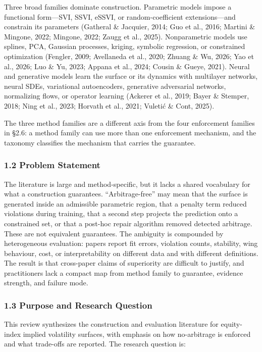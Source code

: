 \documentclass[11pt]{article}
\begin{document}
Three broad families dominate construction. Parametric models impose a functional form—SVI, SSVI, eSSVI, or random-coefficient extensions—and constrain its parameters (Gatheral \& Jacquier, 2014; Guo et al., 2016; Martini \& Mingone, 2022; Mingone, 2022; Zaugg et al., 2025). Nonparametric models use splines, PCA, Gaussian processes, kriging, symbolic regression, or constrained optimization (Fengler, 2009; Avellaneda et al., 2020; Zhuang \& Wu, 2026; Yao et al., 2026; Luo \& Yu, 2023; Appana et al., 2024; Cousin \& Gueye, 2021). Neural and generative models learn the surface or its dynamics with multilayer networks, neural SDEs, variational autoencoders, generative adversarial networks, normalizing flows, or operator learning (Ackerer et al., 2019; Bayer \& Stemper, 2018; Ning et al., 2023; Horvath et al., 2021; Vuletić \& Cont, 2025).

The three method families are a different axis from the four enforcement families in \S 2.6: a method family can use more than one enforcement mechanism, and the taxonomy classifies the mechanism that carries the guarantee.

\subsubsection*{1.2 Problem Statement}
The literature is large and method-specific, but it lacks a shared vocabulary for what a construction guarantees. “Arbitrage-free” may mean that the surface is generated inside an admissible parametric region, that a penalty term reduced violations during training, that a second step projects the prediction onto a constrained set, or that a post-hoc repair algorithm removed detected arbitrage. These are not equivalent guarantees. The ambiguity is compounded by heterogeneous evaluation: papers report fit errors, violation counts, stability, wing behaviour, cost, or interpretability on different data and with different definitions. The result is that cross-paper claims of superiority are difficult to justify, and practitioners lack a compact map from method family to guarantee, evidence strength, and failure mode.

\subsubsection*{1.3 Purpose and Research Question}
This review synthesizes the construction and evaluation literature for equity-index implied volatility surfaces, with emphasis on how no-arbitrage is enforced and what trade-offs are reported. The research question is:
\end{document}
